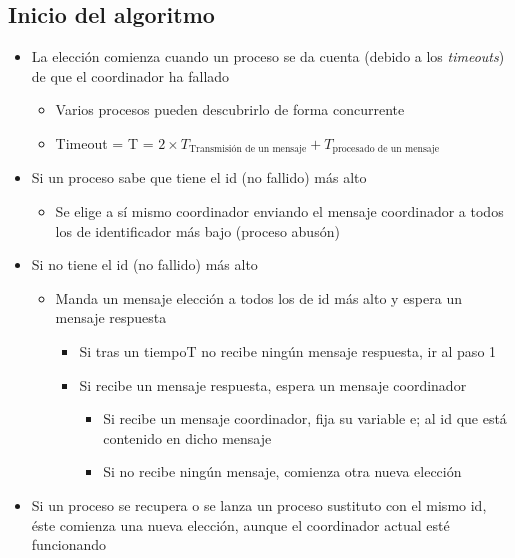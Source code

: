 \documentclass[a4paper,12pt]{article}
\begin{document}
\subsection*{Inicio del algoritmo}
\begin{itemize}
    \item La elección comienza cuando un proceso se da cuenta (debido a los \textit{timeouts}) de que el coordinador ha fallado
    \begin{itemize}
        \item Varios procesos pueden descubrirlo de forma concurrente
        \item Timeout = T = $2 \times T_{\text{Transmisión de un mensaje}} + T_{\text{procesado de un mensaje}}$
    \end{itemize}
    \item Si un proceso sabe que tiene el id (no fallido) más alto
    \begin{itemize}
        \item Se elige a sí mismo coordinador enviando el mensaje coordinador a todos los de identificador más bajo (proceso abusón)
    \end{itemize}
    \item Si no tiene el id (no fallido) más alto
    \begin{itemize}
        \item Manda un mensaje elección a todos los de id más alto y espera un mensaje respuesta
        \begin{itemize}
            \item Si tras un tiempoT no recibe ningún mensaje respuesta, ir al paso 1
            \item Si recibe un mensaje respuesta, espera un mensaje coordinador
            \begin{itemize}
                \item Si recibe un mensaje coordinador, fija su variable e; al id que está contenido en dicho mensaje
                \item Si no recibe ningún mensaje, comienza otra nueva elección                
            \end{itemize}
        \end{itemize}
    \end{itemize}
    \item Si un proceso se recupera o se lanza un proceso sustituto con el mismo id, éste comienza una nueva elección, aunque el coordinador actual esté funcionando
\end{itemize}
\end{document}
